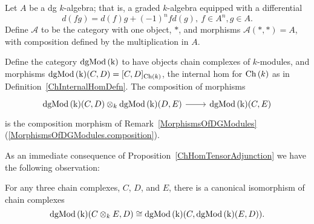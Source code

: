 \documentclass[dissertation.tex]{subfiles}
\begin{document}
\begin{eg}
  \begin{description}[style=nextline]
  \item[dg category with one object]
    Let $A$ be a dg $k$-algebra; that is, a graded $k$-algebra equipped with a differential
    $$d(fg) = d(f)g + (-1)^nfd(g),\ f \in A^n, g \in A.$$
    Define $\mathscr{A}$ to be the category with one object, $\ast$, and morphisms $\mathscr{A}(\ast, \ast) = A$, with composition defined by the multiplication in $A$.
  \item[dg $k$-modules]
    Define the category $\operatorname{dgMod\left(k\right)}$ to have objects chain complexes of $k$-modules, and morphisms $\operatorname{dgMod\left(k\right)}(C,D) = [C,D]_{\operatorname{Ch}\left(k\right)}$, the internal hom for $\operatorname{Ch}\left(k\right)$ as in Definition~\ref{ChInternalHomDefn}.
    The composition of morphisms
    $$\begin{tikzcd}
      \cdg{k}(C,D) \otimes_k \cdg{k}(D,E) \arrow{r} & \cdg{k}(C,E)
    \end{tikzcd}$$
    is the composition morphism of Remark~\ref{MorphismsOfDGModules} (\ref{MorphismsOfDGModules.composition}).
    
    As an immediate consequence of Proposition~\ref{ChHomTensorAdjunction} we have the following observation:
    \begin{prop}
      For any three chain complexes, $C$, $D$, and $E$, there is a canonical isomorphism of chain complexes
      $$\operatorname{dgMod\left(k\right)}(C \otimes_k E, D) \cong \operatorname{dgMod\left(k\right)}(C,\operatorname{dgMod\left(k\right)}(E,D)).$$
      

\end{prop}
\end{description}
\end{eg}
\end{document}
